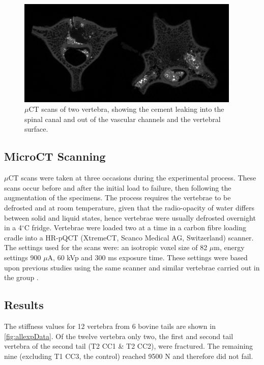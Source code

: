 \begin{figure}[ht!]
\centering
\includegraphics[width=4.18472in]{images/bigLeakage_noBluTac.png}
\caption{$\mu$CT scans of two vertebra, showing the cement leaking into the spinal canal and out of the vascular channels and the vertebral surface.}
\label{fig:2vertWithoutBluTac}
\end{figure}


\subsection{MicroCT Scanning}

$\mu$CT scans were taken at three occasions during the experimental process.
These scans occur before and after the initial load to failure, then following
the augmentation of the specimens. The process requires the vertebrae to be
defrosted and at room temperature, given that the radio-opacity of water
differs between solid and liquid states, hence vertebrae were usually defrosted
overnight in a 4$^\circ$C fridge. Vertebrae were loaded two at a time in a
carbon fibre loading cradle into a HR-pQCT (XtremeCT, Scanco Medical
AG, Switzerland) scanner. The settings used for the scans were: an isotropic
voxel size of 82 $\mu$m, energy settings 900 $\mu$A, 60 kVp and 300 ms exposure
time. These settings were based upon previous studies using the same scanner
and similar vertebrae carried out in the group \cite{zapata2017methodology,
Sikora2013a, RobsonBrown2014, Wijayathunga2008}.

\subsection{Results}\label{results}

The stiffness values for 12 vertebra from 6 bovine tails are shown in \cref{fig:allexpData}. Of the twelve vertebra only two,
the first and second tail vertebra of the second tail (T2 CC1 \& T2 CC2), were
fractured. The remaining nine (excluding T1 CC3, the control) reached 9500 N
and therefore did not fail.

